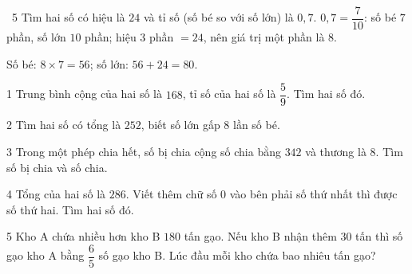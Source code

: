 \gap
\begin{exbox}{\ExWord\ 5}
Tìm hai số có hiệu là $24$ và tỉ số (số bé so với số lớn) là $0{,}7$.
\guide
$0{,}7=\dfrac7{10}$: số bé $7$ phần, số lớn $10$ phần; hiệu $3$ phần $=24$, nên giá trị một phần là $8$.\par
Số bé: $8\times7=56$; số lớn: $56+24=80$.
\end{exbox}
\begin{probbox}{1}{\relax}
Trung bình cộng của hai số là $168$, tỉ số của hai số là $\dfrac59$. Tìm hai số đó.
\end{probbox}
\gap
\begin{probbox}{2}{\relax}
Tìm hai số có tổng là $252$, biết số lớn gấp $8$ lần số bé.
\end{probbox}
\gap
\begin{probbox}{3}{\relax}
Trong một phép chia hết, số bị chia cộng số chia bằng $342$ và thương là $8$. Tìm số bị chia và số chia.
\end{probbox}
\gap
\begin{probbox}{4}{\relax}
Tổng của hai số là $286$. Viết thêm chữ số $0$ vào bên phải số thứ nhất thì được số thứ hai. Tìm hai số đó.
\end{probbox}
\gap
\begin{probbox}{5}{\relax}
Kho A chứa nhiều hơn kho B $180$ tấn gạo. Nếu kho B nhận thêm $30$ tấn thì số gạo kho A bằng $\dfrac65$ số gạo kho B. Lúc đầu mỗi kho chứa bao nhiêu tấn gạo?
\end{probbox}
